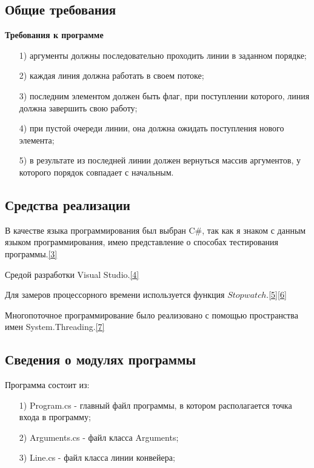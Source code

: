 \documentclass[14pt, a4paper]{extarticle}
\begin{document}
\subsection{Общие требования}
\textbf{Требования к программе}
\begin{enumerate}
	\item[1)] аргументы должны последовательно проходить линии в заданном порядке;
	\item[2)] каждая линия должна работать в своем потоке;
	\item[3)] последним элементом должен быть флаг, при поступлении которого, линия должна завершить свою работу;
	\item[4)] при пустой очереди линии, она должна ожидать поступления нового элемента;
	\item[5)] в результате из последней линии должен вернуться массив аргументов, у которого порядок совпадает с начальным.
\end{enumerate}
\subsection{Средства реализации}
В качестве языка программирования был выбран C\#, так как я знаком с данным языком программирования, имею представление о способах тестирования программы.\hyperref[literature]{[3]}\par
Средой разработки Visual Studio.\hyperref[literature]{[4]}\par 
Для замеров процессорного времени используется функция $Stopwatch$.\hyperref[literature]{[5]}\hyperref[literature]{[6]}\par
Многопоточное программирование было реализовано с помощью пространства имен System.Threading.\hyperref[literature]{[7]}
\subsection{Сведения о модулях программы}
Программа состоит из:
\begin{enumerate}
	\item[1)] Program.cs - главный файл программы, в котором располагается точка входа в программу;
	\item[2)] Arguments.cs - файл класса Arguments;
	\item[3)] Line.cs - файл класса линии конвейера;
\end{enumerate}
\end{document}

